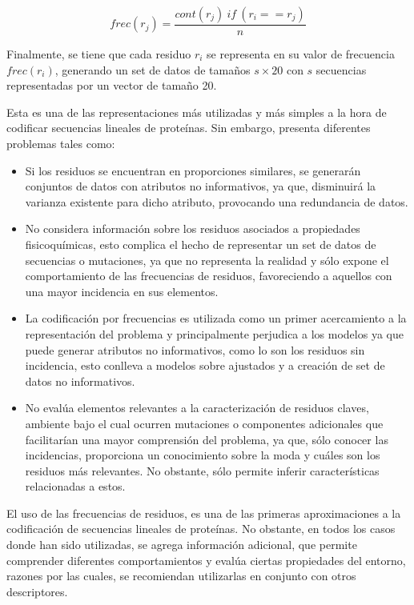 \begin{equation}
	frec(r_{j}) = \dfrac{cont(r_{j})\ if\  (r_{i}==r_{j})}{n}
\end{equation}

Finalmente, se tiene que cada residuo $r_{i}$ se representa en su valor de frecuencia $frec(r_{i})$, generando un set de datos de tamaños $s \times 20$ con $s$ secuencias representadas por un vector de tamaño 20.

Esta es una de las representaciones más utilizadas y más simples a la hora de codificar secuencias lineales de proteínas. Sin embargo, presenta diferentes problemas tales como:

\begin{itemize}
	
	\item Si los residuos se encuentran en proporciones similares, se generarán conjuntos de datos con atributos no informativos, ya que, disminuirá la varianza existente para dicho atributo, provocando una redundancia de datos.
	
	\item No considera información sobre los residuos asociados a propiedades fisicoquímicas, esto complica el hecho de representar un set de datos de secuencias o mutaciones, ya que no representa la realidad y sólo expone el comportamiento de las frecuencias de residuos, favoreciendo a aquellos con una mayor incidencia en sus elementos.
	
	\item La codificación por frecuencias es utilizada como un primer acercamiento a la representación del problema y principalmente perjudica a los modelos ya que puede generar atributos no informativos, como lo son los residuos sin incidencia, esto conlleva a modelos sobre ajustados y a creación de set de datos no informativos.
	
	\item No evalúa elementos relevantes a la caracterización de residuos claves, ambiente bajo el cual ocurren mutaciones o componentes adicionales que facilitarían una mayor comprensión del problema, ya que, sólo conocer las incidencias, proporciona un conocimiento sobre la moda y cuáles son los residuos más relevantes. No obstante, sólo permite inferir características relacionadas a estos.
\end{itemize}

El uso de las frecuencias de residuos, es una de las primeras aproximaciones a la codificación de secuencias lineales de proteínas. No obstante, en todos los casos donde han sido utilizadas, se agrega información adicional, que permite comprender diferentes comportamientos y evalúa ciertas propiedades del entorno, razones por las cuales, se recomiendan utilizarlas en conjunto con otros descriptores. 

